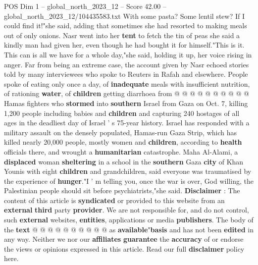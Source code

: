 \begin{textsample}{POS Dim 1 – global\_north\_2023\_12 – Score 42.00 – global\_north\_2023\_12/104435583.txt}
With some pasta?
Some lentil stew?
If I could find it!"she said, adding that sometimes she had resorted to making meals out of only onions.
Nasr went into her \textbf{tent} to fetch the tin of peas she said a kindly man had given her, even though he had bought it for himself."This is it.
This can is all we have for a whole day,"she said, holding it up, her voice rising in anger.
Far from being an extreme case, the account given by Nasr echoed stories told by many interviewees who spoke to Reuters in Rafah and elsewhere.
People spoke of eating only once a day, of \textbf{inadequate} meals with insufficient nutrition, of rationing \textbf{water}, of \textbf{children} getting diarrhoea from @ @ @ @ @ @ @ @ @ @ Hamas fighters who \textbf{stormed} into \textbf{southern} Israel from Gaza on Oct. 7, killing 1,200 people including babies and \textbf{children} and capturing 240 hostages of all ages in the deadliest day of Israel ' s 75-year history.
Israel has responded with a military assault on the densely populated, Hamas-run Gaza Strip, which has killed nearly 20,000 people, mostly women and \textbf{children}, according to \textbf{health} officials there, and wrought a \textbf{humanitarian} catastrophe.
Maha Al-Alami, a \textbf{displaced} woman \textbf{sheltering} in a school in the \textbf{southern} Gaza \textbf{city} of Khan Younis with eight \textbf{children} and grandchildren, said everyone was traumatised by the experience of \textbf{hunger}."I ' m telling you, once the war is over, God willing, the Palestinian people should sit before psychiatrists,"she said. \textbf{Disclaimer} : The content of this article is \textbf{syndicated} or provided to this website from an \textbf{external} \textbf{third} party \textbf{provider}.
We are not responsible for, and do not control, such \textbf{external} websites, \textbf{entities}, applications or media \textbf{publishers}.
The body of the \textbf{text} @ @ @ @ @ @ @ @ @ @ as \textbf{available}"\textbf{basis} and has not been \textbf{edited} in any way.
Neither we nor our \textbf{affiliates} \textbf{guarantee} the \textbf{accuracy} of or endorse the views or opinions expressed in this article.
Read our full \textbf{disclaimer} policy here.

\end{textsample}
